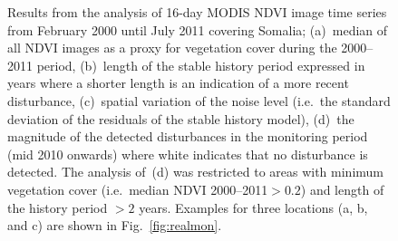 \documentclass[authoryear,preprint,review,10pt]{elsarticle}
\begin{document}
\begin{figure}[htp]
\centering
 \caption{Results from the analysis of 16-day MODIS NDVI image time series from February 2000 until July 2011 covering Somalia; (a)~median of all NDVI
 images as a proxy for vegetation cover during the 2000--2011 period, (b)~length of the stable history period expressed in years where a shorter length is an indication of a more recent disturbance, (c)~spatial variation of the noise level (i.e.\ the standard deviation of the residuals of the stable history model), (d)~the magnitude of the detected disturbances in the monitoring period (mid 2010 onwards) where white indicates that no disturbance is detected. The analysis of~(d) was restricted to areas with minimum vegetation cover (i.e.\ median NDVI  2000--2011$> 0.2$) and length of the history period $> 2$ years. Examples for three locations (a, b, and c)  are shown in Fig.~\ref{fig:realmon}.}
 \label{fig:spatial}
\end{figure}
\end{document}
